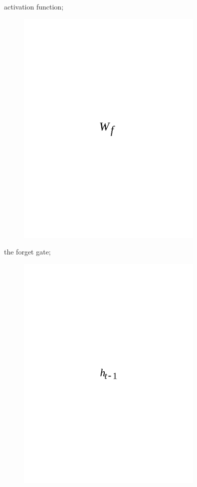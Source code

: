 activation function;
\begin{figure}[H]
	\centering
	\includegraphics[width=0.8\textwidth]{media/ict/image48}
	\caption*{}
\end{figure}

the forget gate;
\begin{figure}[H]
	\centering
	\includegraphics[width=0.8\textwidth]{media/ict/image49}
	\caption*{}
\end{figure}

